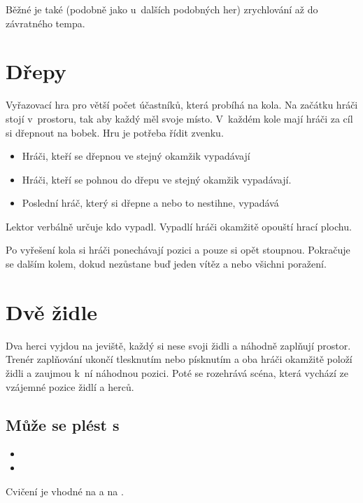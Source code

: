 Běžné je také (podobně jako u~dalších podobných her) zrychlování až do závratného tempa. 
 
 
 
 
\needspace{5cm} \section{Dřepy} \label{dřepy}  
 
Vyřazovací hra pro větší počet účastníků, která probíhá na kola. Na začátku hráči stojí v~prostoru, tak aby každý měl svoje místo. V~každém kole mají hráči za cíl si dřepnout na bobek. Hru je potřeba řídit zvenku. 
 
\begin{itemize}
\item  Hráči, kteří se dřepnou ve stejný okamžik vypadávají
\item  Hráči, kteří se pohnou do dřepu ve stejný okamžik vypadávají.
\item  Poslední hráč, který si dřepne a nebo to nestihne, vypadává
\end{itemize}
 
Lektor verbálně určuje kdo vypadl. Vypadlí hráči okamžitě opouští hrací plochu. 
 
Po vyřešení kola si hráči ponechávají pozici a pouze si opět stoupnou. Pokračuje se dalším kolem, dokud nezůstane buď jeden vítěz a nebo všichni poražení. 
 
 
 
 
\needspace{5cm} \section{Dvě židle} \label{dvě židle} Dva herci vyjdou na jeviště, každý si nese svoji židli a náhodně zaplňují prostor. Trenér zaplňování ukončí tlesknutím nebo písknutím a oba hráči okamžitě položí židli a zaujmou k~ní náhodnou pozici. Poté se rozehrává scéna, která vychází ze vzájemné pozice židlí a herců. 
 
\subsection{Může se plést s} \begin{itemize}
\item  {}
\item  {}
\end{itemize}
 
Cvičení je vhodné na  a na . 
 
